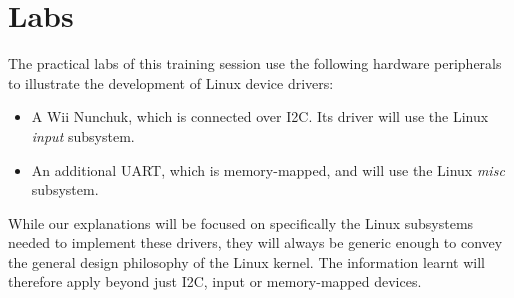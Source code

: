 \documentclass[a4paper]{article}
\begin{document}
\feshowagenda

\section{Labs}

The practical labs of this training session use the following hardware
peripherals to illustrate the development of Linux device drivers:

\begin{itemize}
\item A Wii Nunchuk, which is connected over I2C. Its driver will use the Linux
  {\em input} subsystem.
\item An additional UART, which is memory-mapped, and will use the Linux
  {\em misc} subsystem.
\end{itemize}

While our explanations will be focused on specifically the Linux subsystems
needed to implement these drivers, they will always be generic enough to convey
the general design philosophy of the Linux kernel. The information learnt will
therefore apply beyond just I2C, input or memory-mapped devices.
\end{document}
